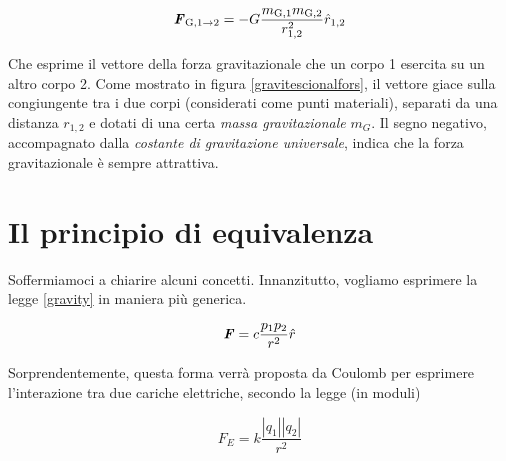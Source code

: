 \begin{tcolorbox}[colback = yellow!30, colframe = yellow!30!black, title = {Legge di gravitazione universale}]
    \begin{align}
        \textbf{\textit{F}}_{\text{G}, 1\to 2} = -G\frac{m_{\text{G},1}m_{\text{G},2}}{r^2_{1,2}}\hat{r}_{1,2}\label{gravity}
    \end{align}    
\end{tcolorbox}

\noindent Che esprime il vettore della forza gravitazionale che un corpo 1 esercita su un
altro corpo 2. Come mostrato in figura \ref{gravitescionalfors}, il vettore giace sulla congiungente tra i due corpi (considerati come
punti materiali), separati da una distanza $r_{1,2}$ e dotati di una certa
\textit{massa gravitazionale} $m_G$. Il segno negativo, accompagnato dalla
\textit{costante di gravitazione universale}, indica che la forza gravitazionale è
sempre attrattiva.

\section{Il principio di equivalenza}
Soffermiamoci a chiarire alcuni concetti. Innanzitutto, vogliamo esprimere la legge
\ref{gravity} in maniera più generica.

\begin{align}
    \textbf{\textit{F}} = c\frac{p_1p_2}{r^2}\hat{r} \label{template}
\end{align}

\noindent Sorprendentemente, questa forma verrà proposta da Coulomb per esprimere
l'interazione tra due cariche elettriche, secondo la legge (in moduli)

\[ F_E = k\frac{|q_1||q_2|}{r^2} \]

